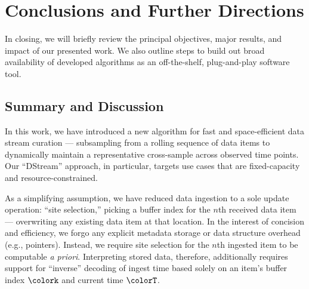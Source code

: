 \section{Conclusions and Further Directions} \label{sec:conclusion}

In closing, we will briefly review the principal objectives, major results, and impact of our presented work.
We also outline steps to build out broad availability of developed algorithms as an off-the-shelf, plug-and-play software tool.

\subsection{Summary and Discussion}

In this work, we have introduced a new algorithm for fast and space-efficient data stream curation --- subsampling from a rolling sequence of data items to dynamically maintain a representative cross-sample across observed time points.
Our ``DStream'' approach, in particular, targets use cases that are fixed-capacity and resource-constrained.

As a simplifying assumption, we have reduced data ingestion to a sole update operation: ``site selection,'' picking a buffer index for the $n$th received data item --- overwriting any existing data item at that location.
In the interest of concision and efficiency, we forgo any explicit metadata storage or data structure overhead (e.g., pointers).
Instead, we require site selection for the $n$th ingested item to be computable \textit{a priori}.
Interpreting stored data, therefore, additionally requires support for ``inverse'' decoding of ingest time based solely on an item's buffer index $\colork$ and current time $\colorT$.

